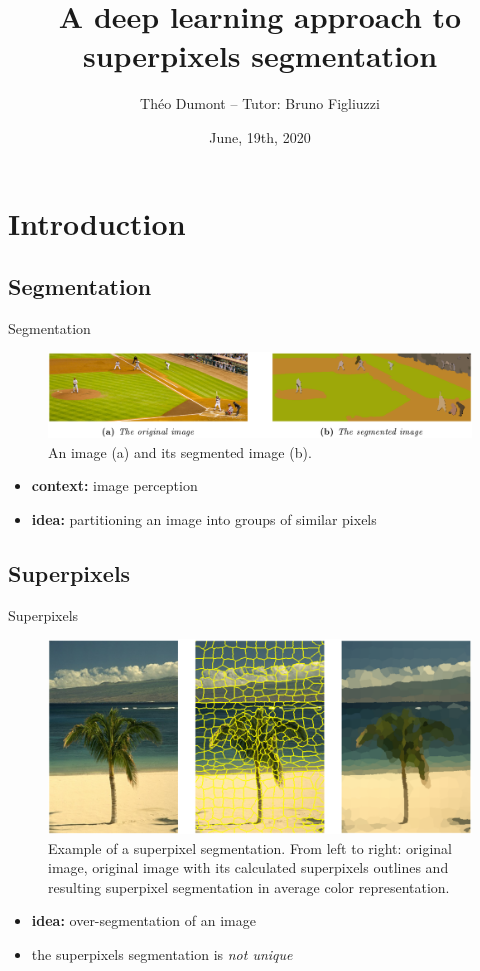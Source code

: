 \documentclass[9pt]{beamer}
\title[S3 Research Internship]{A deep learning approach to superpixels segmentation}
\author{Théo Dumont -- Tutor: Bruno Figliuzzi}
\institute[Inst.]{Center for Mathematical Morphology \\Mines ParisTech - PSL Research University}
\date{June, 19th, 2020}
\begin{document}

\begin{frame}
\titlepage
\end{frame}

\section{Introduction}
\subsection{Segmentation}
\begin{frame}{Segmentation}
\begin{figure}
    \centering
    \includegraphics[width=\textwidth]{pics/segm.png}
    \caption{An image (a) and its segmented image (b).}
\end{figure}

\begin{itemize}
    \item \textbf{context:} image perception
    \item \textbf{idea:} partitioning an image into groups of similar pixels
\end{itemize}
\end{frame}
\subsection{Superpixels}
\begin{frame}{Superpixels}
\begin{figure}
    \centering
    \includegraphics[width=.9\textwidth]{pics/spp.png}
    \caption{Example of a superpixel segmentation. From left to right: original image, original image with its calculated superpixels outlines and resulting superpixel segmentation in average color representation.}
\end{figure}

\begin{itemize}
    \item \textbf{idea:} over-segmentation of an image
    \item the superpixels segmentation is \textit{not unique}
\end{itemize}
\end{frame}
\end{document}
